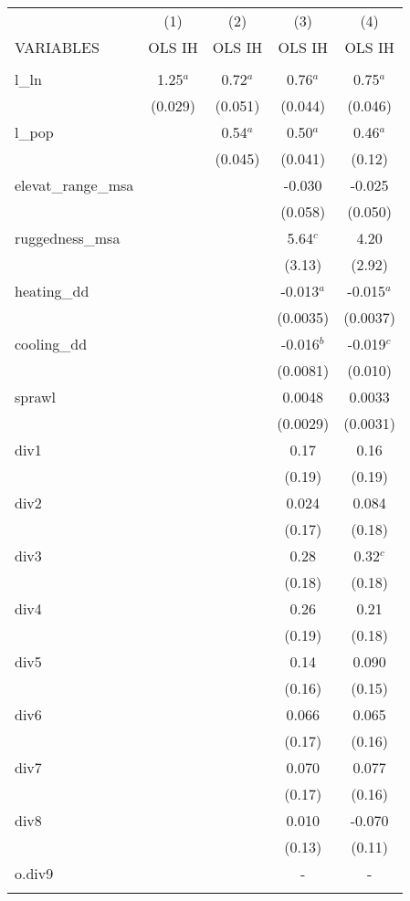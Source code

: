 \documentclass[]{article}
\begin{document}
\begin{tabular}{lcccc} \hline
 & (1) & (2) & (3) & (4) \\
VARIABLES & OLS IH & OLS IH & OLS IH & OLS IH \\ \hline
 &  &  &  &  \\
l\_ln & 1.25$^a$ & 0.72$^a$ & 0.76$^a$ & 0.75$^a$ \\
 & (0.029) & (0.051) & (0.044) & (0.046) \\
l\_pop &  & 0.54$^a$ & 0.50$^a$ & 0.46$^a$ \\
 &  & (0.045) & (0.041) & (0.12) \\
elevat\_range\_msa &  &  & -0.030 & -0.025 \\
 &  &  & (0.058) & (0.050) \\
ruggedness\_msa &  &  & 5.64$^c$ & 4.20 \\
 &  &  & (3.13) & (2.92) \\
heating\_dd &  &  & -0.013$^a$ & -0.015$^a$ \\
 &  &  & (0.0035) & (0.0037) \\
cooling\_dd &  &  & -0.016$^b$ & -0.019$^c$ \\
 &  &  & (0.0081) & (0.010) \\
sprawl &  &  & 0.0048 & 0.0033 \\
 &  &  & (0.0029) & (0.0031) \\
div1 &  &  & 0.17 & 0.16 \\
 &  &  & (0.19) & (0.19) \\
div2 &  &  & 0.024 & 0.084 \\
 &  &  & (0.17) & (0.18) \\
div3 &  &  & 0.28 & 0.32$^c$ \\
 &  &  & (0.18) & (0.18) \\
div4 &  &  & 0.26 & 0.21 \\
 &  &  & (0.19) & (0.18) \\
div5 &  &  & 0.14 & 0.090 \\
 &  &  & (0.16) & (0.15) \\
div6 &  &  & 0.066 & 0.065 \\
 &  &  & (0.17) & (0.16) \\
div7 &  &  & 0.070 & 0.077 \\
 &  &  & (0.17) & (0.16) \\
div8 &  &  & 0.010 & -0.070 \\
 &  &  & (0.13) & (0.11) \\
o.div9 &  &  & - & - \\
 &  &  &  &  \\

\end{tabular}
\end{document}

